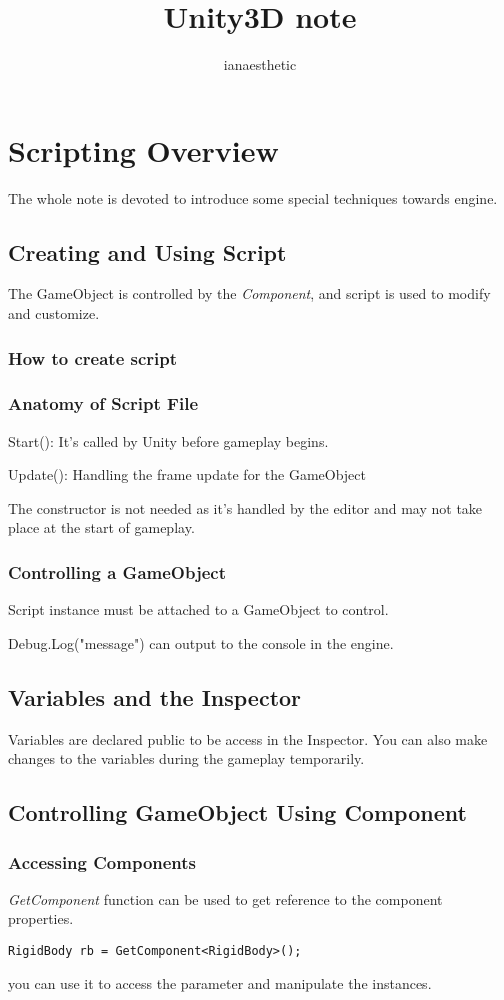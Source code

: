\documentclass[10pt, a4paper]{article}
\author{ianaesthetic}
\title{Unity3D note}
\begin{document}
    \section{Scripting Overview}
        The whole note is devoted to introduce some special techniques towards engine. 
        \subsection{Creating and Using Script}
            The GameObject is controlled by the \emph{Component}, and script is used to modify and customize. 
            \subsubsection{How to create script}
            \subsubsection{Anatomy of Script File}
                Start(): It's called by Unity before gameplay begins.
                
                Update(): Handling the frame update for the GameObject
                
                The constructor is not needed as it's handled by the editor and may not take place at the start of gameplay. 

            \subsubsection{Controlling a GameObject}
                Script instance must be attached to a GameObject to control. 

                Debug.Log("message") can output to the console in the engine. 
            
        \subsection{Variables and the Inspector}
            Variables are declared public to be access in the Inspector. You can also make changes to the variables during the gameplay temporarily. 
        \subsection{Controlling GameObject Using Component}
            \subsubsection{Accessing Components}
                \emph{GetComponent} function can be used to get reference to the component properties. 
\begin{lstlisting}
RigidBody rb = GetComponent<RigidBody>(); 
\end{lstlisting}
                you can use it to access the parameter and manipulate the instances.
\end{document}
